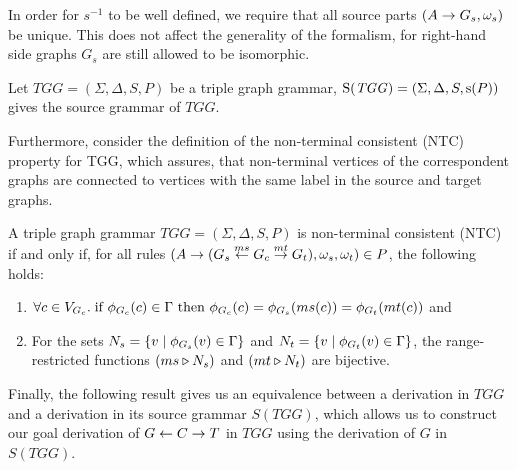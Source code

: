 \documentclass[runningheads]{llncs}
\begin{document}
In order for $s^{-1}$ to be well defined, we require that all source parts $(A \pro G_s,\omega_s)$ be unique. This does not affect the generality of the formalism, for right-hand side graphs $G_s$ are still allowed to be isomorphic.

\begin{definition}
	\label{def:Source}
	Let $\mathit{TGG} = (\Sigma, \Delta, S, P)$ be a triple graph grammar, $\Source(\mathit{TGG}) = (\Sigma, \Delta, S, \source(P))$ gives the source grammar of $\mathit{TGG}$.
\end{definition}

Furthermore, consider the definition of the non-terminal consistent (NTC) property for TGG, which assures, that non-terminal vertices of the correspondent graphs are connected to vertices with the same label in the source and target graphs.

\begin{definition}
	A triple graph grammar $\mathit{TGG} = (\Sigma, \Delta, S, P)$ is non-terminal consistent (NTC) if and only if, for all rules $(A \pro (G_s \ms{ms} G_c \mt{mt} G_t), \omega_s, \omega_t) \in P$, the following holds:
	\begin{enumerate}
		\item $\forall c \in V_{G_c} \. \text{if } \phi_{G_c}(c) \in \Gamma \text{ then } \phi_{G_c}(c) = \phi_{G_s}(ms(c)) = \phi_{G_t}(mt(c))$ and
		\item For the sets $N_s = \{v \st \phi_{G_s}(v) \in \Gamma\}$ and $N_t = \{v \st \phi_{G_t}(v) \in \Gamma\}$, the range-restricted functions $(ms \rrestr N_s)$ and $(mt \rrestr N_t)$ are bijective.
	\end{enumerate}
\end{definition}

Finally, the following result gives us an equivalence between a derivation in $\mathit{TGG}$ and a derivation in its source grammar $S(\mathit{TGG})$, which allows us to construct our goal derivation of $G \ms{} C \mt{} T$ in $\mathit{TGG}$ using the derivation of $G$ in $S(\mathit{TGG})$.
\end{document}
